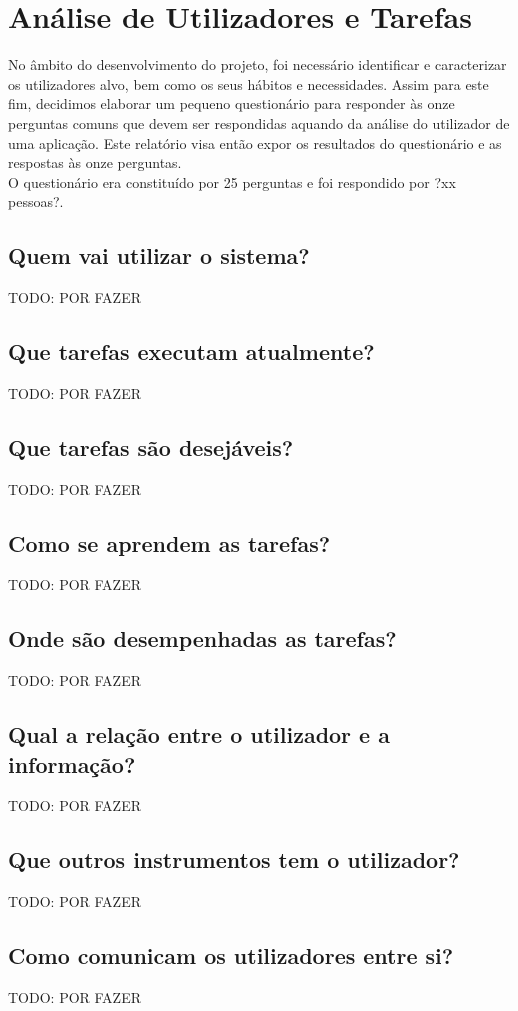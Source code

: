 \documentclass{article}
\begin{document}
\section*{Análise de Utilizadores e Tarefas}

No âmbito do desenvolvimento do projeto, foi necessário identificar e caracterizar os utilizadores alvo, bem como os seus hábitos e necessidades. Assim para este fim, decidimos elaborar um pequeno questionário para responder às onze perguntas comuns que devem ser respondidas aquando da análise do utilizador de uma aplicação. Este relatório visa então expor os resultados do questionário e as respostas às onze perguntas.\\
O questionário era constituído por 25 perguntas e foi respondido por ?xx pessoas?.

\subsection*{Quem vai utilizar o sistema?}
TODO: POR FAZER
\subsection*{Que tarefas executam atualmente?}
TODO: POR FAZER
\subsection*{Que tarefas são desejáveis?}
TODO: POR FAZER
\subsection*{Como se aprendem as tarefas?}
TODO: POR FAZER
\subsection*{Onde são desempenhadas as tarefas?}
TODO: POR FAZER
\subsection*{Qual a relação entre o utilizador e a informação?}
TODO: POR FAZER
\subsection*{Que outros instrumentos tem o utilizador?}
TODO: POR FAZER
\subsection*{Como comunicam os utilizadores entre si?}
TODO: POR FAZER
\end{document}
